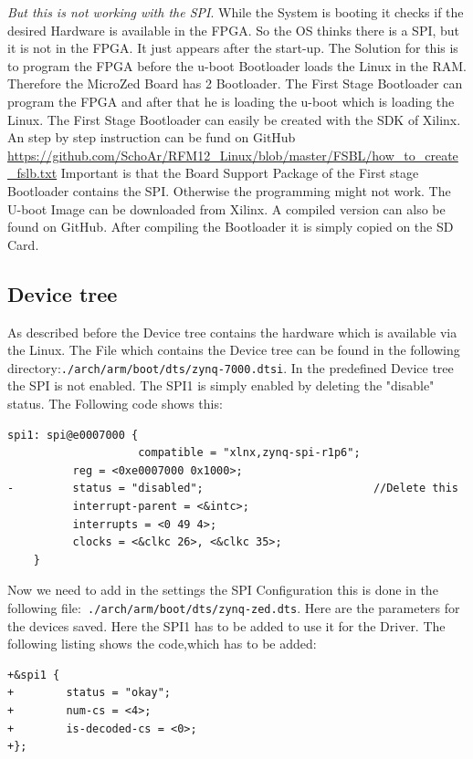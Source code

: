 \emph{But this is not working with the SPI}. While the System is booting it checks if the desired Hardware is available in the FPGA. So the OS thinks there is a SPI, but it is not in the FPGA. It just appears after the start-up. The Solution for this is to program the FPGA before the u-boot Bootloader loads the Linux in the RAM. Therefore the MicroZed Board has 2 Bootloader. The First Stage Bootloader can program the FPGA and after that he is loading the u-boot which is loading the Linux. The First Stage Bootloader can easily be created with the SDK of Xilinx. An step by step instruction can be fund on GitHub \url{https://github.com/SchoAr/RFM12_Linux/blob/master/FSBL/how_to_create_fslb.txt}\newline
Important is that the Board Support Package of the First stage Bootloader contains the SPI. Otherwise the programming might not work. The U-boot Image can be downloaded from Xilinx. A compiled version can also be found on GitHub. After compiling the Bootloader it is simply copied on the SD Card. 

\subsection{Device tree}

As described before the Device tree contains the hardware which is available via the Linux. The File which contains the Device tree can be found in the following directory:\newline\verb|./arch/arm/boot/dts/zynq-7000.dtsi|. In the predefined Device tree the SPI is not enabled. The SPI1 is simply enabled by deleting the "disable" status. The Following code shows this:

\begin{lstlisting}
spi1: spi@e0007000 {
					compatible = "xlnx,zynq-spi-r1p6";
          reg = <0xe0007000 0x1000>;
-         status = "disabled";   						//Delete this
          interrupt-parent = <&intc>;
          interrupts = <0 49 4>;
          clocks = <&clkc 26>, <&clkc 35>;
    }                                                                                                                           
\end{lstlisting}

Now we need to add in the settings the SPI Configuration this is done in the following file:\newline\verb| ./arch/arm/boot/dts/zynq-zed.dts|. Here are the parameters for the devices saved. Here the SPI1 has to be added to use it for the Driver. The following listing shows the code,which has to be added:
\begin{lstlisting}
+&spi1 {
+        status = "okay";
+        num-cs = <4>;
+        is-decoded-cs = <0>;
+};
\end{lstlisting}

